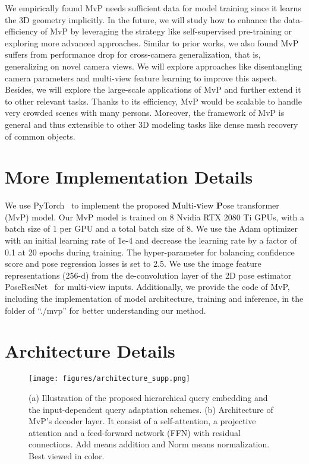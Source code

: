 \documentclass{article}
\begin{document}
We empirically found MvP needs sufficient data for model training since it learns the 3D geometry implicitly. In the future, we will study how to enhance the data-efficiency of MvP by leveraging the strategy like self-supervised pre-training or exploring more advanced approaches. Similar to prior works, we also found MvP suffers from performance drop for cross-camera generalization, that is, generalizing on novel camera views. We will explore approaches like disentangling camera parameters and multi-view feature learning to improve this aspect.
Besides, we will explore the large-scale applications of MvP and further extend it to other relevant tasks. Thanks to its efficiency, MvP would be scalable to handle very crowded  scenes with many persons. Moreover, the framework of MvP is general and thus  extensible to other 3D modeling tasks like dense mesh recovery of common objects. 



{\small
	
	
}

\clearpage
\section*{More Implementation Details}
We use PyTorch~\cite{paszke2017automatic} to implement the proposed \textbf{M}ulti-\textbf{v}iew \textbf{P}ose transformer (MvP) model. 
Our MvP model is trained on 8 Nvidia RTX 2080 Ti GPUs, with a batch size of 1 per GPU and a total batch size of 8. We use the Adam optimizer~\cite{kingma2014adam} with an initial learning rate of 1e-4 and decrease the learning rate by a factor of 0.1 at 20 epochs during training. 
The hyper-parameter  for balancing confidence score and pose regression losses is set to 2.5. 
We use the image feature representations (256-d) from the de-convolution layer of the 2D pose estimator PoseResNet~\cite{xiao2018simple} for multi-view inputs. Additionally, we provide the code of MvP, including the implementation of model architecture, training and inference, in the folder of ``./mvp'' for better understanding our method.


\section*{Architecture Details}


\begin{figure}[h!]
	\centering
	\texttt{[image: figures/architecture\_supp.png]}
	\caption{(a) Illustration of the proposed hierarchical query embedding and the input-dependent query adaptation schemes.  (b) Architecture of MvP's decoder layer. It consist of a self-attention, a projective attention and a feed-forward network (FFN) with residual connections. Add means addition and Norm means normalization. Best viewed in color.}
	\label{supp:fig1}
\end{figure}
\end{document}
